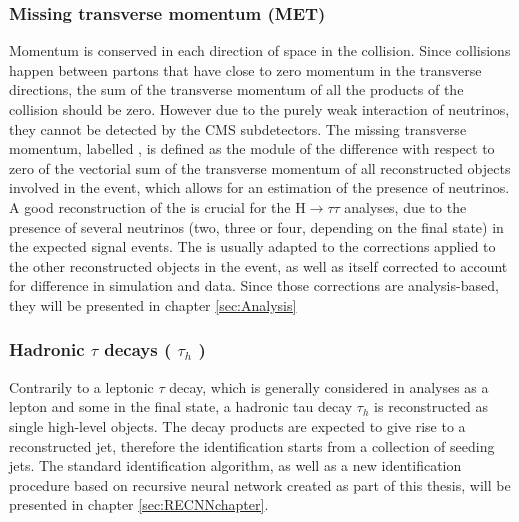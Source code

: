 \subsubsection{Missing transverse momentum (MET)}
Momentum is conserved in each direction of space in the collision. Since collisions happen between partons that have close to zero momentum in the transverse directions, the sum of the transverse momentum of all the products of the collision should be zero. However due to the purely weak interaction of neutrinos, they cannot be detected by the CMS subdetectors. The missing transverse momentum, labelled \ETm, is defined as the module of the difference with respect to zero of the vectorial sum of the transverse momentum of all reconstructed objects involved in the event, which allows for an estimation of the presence of neutrinos. A good reconstruction of the \ETm is crucial for the H$\rightarrow\tau\tau$ analyses, due to the presence of several neutrinos (two, three or four, depending on the final state) in the expected signal events. The \ETm is usually adapted to the corrections applied to the other reconstructed objects in the event, as well as itself corrected to account for difference in simulation and data. Since those corrections are analysis-based, they will be presented in chapter \ref{sec:Analysis}

\subsubsection{Hadronic $\tau$ decays ( $\tau_{h}$ )}
Contrarily to a leptonic $\tau$ decay, which is generally considered in analyses as a lepton and some \ETm in the final state, a hadronic tau decay $\tau_{h}$ is reconstructed as single high-level objects. The \tauh decay products are expected to give rise to a reconstructed jet, therefore the \tauh identification starts from a collection of seeding jets. The standard \tauh identification algorithm, as well as a new identification procedure based on recursive neural network created as part of this thesis, will be presented in chapter \ref{sec:RECNNchapter}.